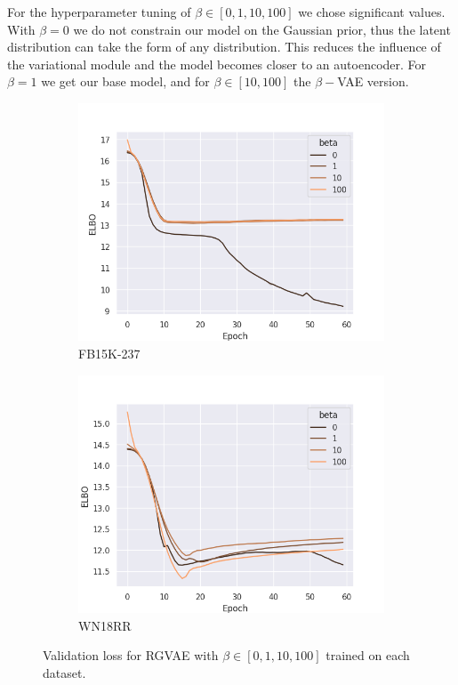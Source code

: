 
For the hyperparameter tuning of $\beta \in [0,1,10,100]$ we chose significant values. With $\beta = 0$ we do not constrain our model on the Gaussian prior, thus the latent distribution can take the form of any distribution. This reduces the influence of the variational module and the model becomes closer to an autoencoder. For $\beta = 1$ we get our base model, and for $\beta \in [10,100]$ the $\beta-$VAE version.


\begin{figure}[H]
    \centering
    \begin{subfigure}{.5\textwidth}
      \centering
      \includegraphics[width=.9\linewidth]{graphs/plots/beta_loss_fb.png}
      \caption{FB15K-237}
      \label{fig5:betafb}
    \end{subfigure}%
    \begin{subfigure}{.5\textwidth}
      \centering
      \includegraphics[width=.9\linewidth]{graphs/plots/beta_loss_wn.png}
      \caption{WN18RR}
      \label{fig5:betawn}
    \end{subfigure}
    \caption{Validation loss for RGVAE with $\beta \in [0,1,10,100]$ trained on each dataset.}
    \label{fig5:beta}
\end{figure}


